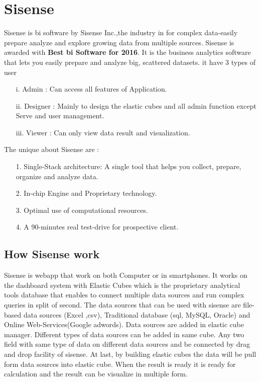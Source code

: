 \section{Sisense}
 \par
Sisense is \acl{bi} software by Sisense Inc.,the  industry in for complex data-easily prepare analyze and explore growing  data from multiple sources. Sisense is awarded with \textbf{Best \acl{bi} Software for    2016}. It is the business analytics software that lets you easily
prepare and analyze big, scattered datasets. it have 3 types of user 
\begin{enumerate}
\item[i.] Admin : Can access all features of Application.
\item[ii.] Designer : Mainly to design the elastic cubes and all admin function except Serve and user management.
\item[iii.] Viewer : Can only view data result and visualization.
\end{enumerate}
\par The  unique about Sisense are :

\begin{enumerate}
\item[1.] Single-Stack architecture: A single tool that helps you collect, prepare, organize and analyze data.
\item[2.] In-chip Engine and Proprietary technology.
\item[3.] Optimal use of computational resources.
\item[4.] A 90-minutes real test-drive for prospective client.
\end{enumerate}
\par
\subsection{How Sisense work}
Sisense is webapp that work on  both Computer or in smartphones. It works on the dashboard system with Elastic Cubes which is the proprietary analytical tools database that enables to connect multiple data sources and run complex queries in split of second. The data sources that can be used with sisense are file-based data sources (Excel ,\acs{csv}), Traditional database (\acs{sql}, MySQL, Oracle) and Online Web-Services(Google adwords). Data sources are added in elastic cube manager.
 Different  types of data sources can be added in same cube. Any two field with same type of data on different data sources and be connected by drag and  drop facility of sisense. At last, by building elastic cubes the data will be pull form data sources into elastic cube. When the result is ready it is ready for calculation and the result can be visualize in multiple form.
\newpage

